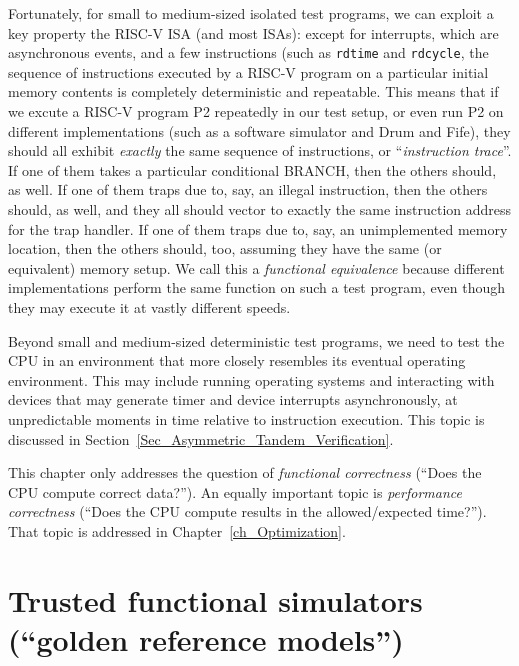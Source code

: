 Fortunately, for small to medium-sized isolated test programs, we can
exploit a key property the RISC-V ISA (and most ISAs): except for
interrupts, which are asynchronous events, and a few instructions
(such as \verb|rdtime| and \verb|rdcycle|, the sequence of
instructions executed by a RISC-V program on a particular initial
memory contents is completely deterministic and repeatable.  This
means that if we excute a RISC-V program P2 repeatedly in our test
setup, or even run P2 on different implementations (such as a software
simulator and Drum and Fife), they should all exhibit \emph{exactly}
the same sequence of instructions, or ``\emph{instruction trace}''.
If one of them takes a particular conditional BRANCH, then the others
should, as well.  If one of them traps due to, say, an illegal
instruction, then the others should, as well, and they all should
vector to exactly the same instruction address for the trap handler.
If one of them traps due to, say, an unimplemented memory location,
then the others should, too, assuming they have the same (or
equivalent) memory setup.  We call this a \emph{functional
equivalence} because different implementations perform the same
function on such a test program, even though they may execute it at
vastly different speeds.

Beyond small and medium-sized deterministic test programs, we need to
test the CPU in an environment that more closely resembles its
eventual operating environment.  This may include running operating
systems and interacting with devices that may generate timer and
device interrupts asynchronously, {\ie} at unpredictable moments in
time relative to instruction execution.  This topic is discussed in
Section~\ref{Sec_Asymmetric_Tandem_Verification}.

This chapter only addresses the question of \emph{functional
correctness} (``Does the CPU compute correct data?'').  An equally
important topic is \emph{performance correctness} (``Does the CPU
compute results in the allowed/expected time?'').  That topic is
addressed in Chapter~\ref{ch_Optimization}.


\section{Trusted functional simulators (``golden reference models'')}


